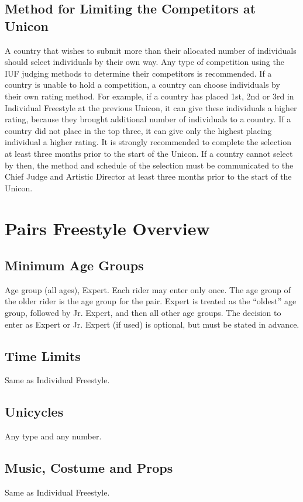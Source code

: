 \subsection{Method for Limiting the Competitors at Unicon}
A country that wishes to submit more than their allocated number of individuals should select individuals by their own way.
Any type of competition using the IUF judging methods to determine their competitors is recommended.
If a country is unable to hold a competition, a country can choose individuals by their own rating method.
For example, if a country has placed 1st, 2nd or 3rd in Individual Freestyle at the previous Unicon, it can give these individuals a higher rating, because they brought additional number of individuals to a country.
If a country did not place in the top three, it can give only the highest placing individual a higher rating.
It is strongly recommended to complete the selection at least three months prior to the start of the Unicon.
If a country cannot select by then, the method and schedule of the selection must be communicated to the Chief Judge and Artistic Director at least three months prior to the start of the Unicon.

\section{Pairs Freestyle Overview}

\subsection{Minimum Age Groups}
Age group (all ages), Expert.
Each rider may enter only once.
The age group of the older rider is the age group for the pair.
Expert is treated as the ``oldest'' age group, followed by Jr. Expert, and then all other age groups.
The decision to enter as Expert or Jr. Expert (if used) is optional, but must be stated in advance.

\subsection{Time Limits}
Same as Individual Freestyle.

\subsection{Unicycles}
Any type and any number.

\subsection{Music, Costume and Props}
Same as Individual Freestyle.

